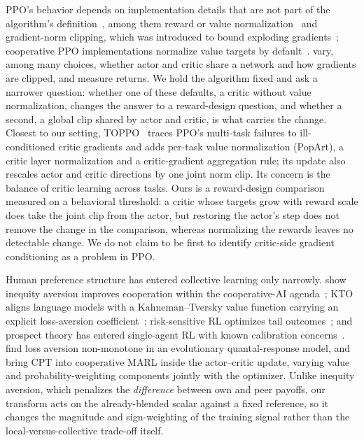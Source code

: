 PPO's behavior depends on implementation details that are not part of the algorithm's
definition~\citep{engstrom2020implementation,andrychowicz2021matters,henderson2018matters}, among them reward
or value normalization~\citep{vanhasselt2016popart} and gradient-norm clipping, which was introduced to bound
exploding gradients~\citep{pascanu2013difficulty}; cooperative PPO implementations normalize value targets by
default~\citep{yu2022surprising}. \citet{andrychowicz2021matters} vary, among many choices, whether actor and
critic share a network and how gradients are clipped, and measure returns. We hold the algorithm fixed and ask a
narrower question: whether one of these defaults, a critic without value normalization, changes the answer to a
reward-design question, and whether a second, a global clip shared by actor and critic, is what carries the change.
Closest to our setting, TOPPO~\citep{li2026toppo} traces PPO's
multi-task failures to ill-conditioned critic gradients and adds per-task value normalization (PopArt), a critic
layer normalization and a critic-gradient aggregation rule; its update also rescales actor and critic directions by
one joint norm clip. Its concern is the balance of critic learning across tasks. Ours is a reward-design comparison
measured on a behavioral threshold: a critic whose targets grow with reward scale does take the joint clip from the
actor, but restoring the actor's step does not remove the change in the comparison, whereas normalizing the rewards leaves no detectable change. We do not claim to be first to identify
critic-side gradient conditioning as a problem in PPO.

Human preference structure has entered collective learning only narrowly.
\citet{hughes2018inequity} show inequity aversion improves cooperation within the cooperative-AI
agenda~\citep{dafoe2020open,hammond2025multiagent,barfuss2020caring}; KTO aligns language models with a
Kahneman--Tversky value function carrying an explicit loss-aversion
coefficient~\citep{ethayarajh2024kto}; risk-sensitive RL optimizes tail
outcomes~\citep{qiu2021rmix,xie2023riskq,prashanth2014cvar,tamar2015optimizing}; and prospect theory has
entered single-agent RL with known calibration
concerns~\citep{prashanth2016cumulative,rabin2000risk,tversky1992}. \citet{mengesha2025} find loss
aversion non-monotone in an evolutionary quantal-response model, and \citet{lalmohammed2025} bring CPT
into cooperative MARL inside the actor--critic update, varying value and probability-weighting
components jointly with the optimizer. Unlike inequity aversion, which penalizes the \emph{difference}
between own and peer payoffs, our transform acts on the already-blended scalar against a fixed
reference, so it changes the magnitude and sign-weighting of the training signal rather than the
local-versus-collective trade-off itself.

